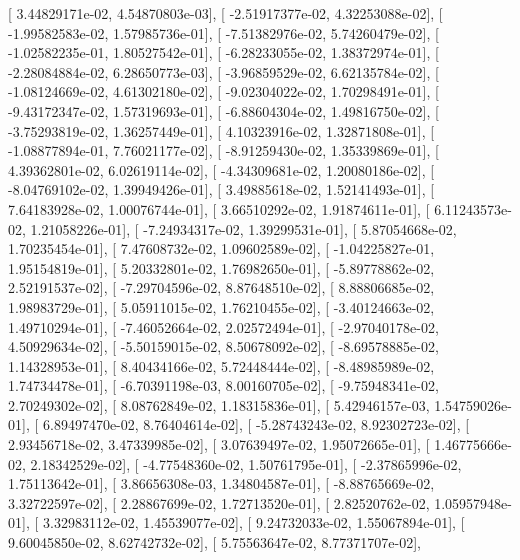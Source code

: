 \documentclass{article}
\begin{document}
       [  3.44829171e-02,   4.54870803e-03],
       [ -2.51917377e-02,   4.32253088e-02],
       [ -1.99582583e-02,   1.57985736e-01],
       [ -7.51382976e-02,   5.74260479e-02],
       [ -1.02582235e-01,   1.80527542e-01],
       [ -6.28233055e-02,   1.38372974e-01],
       [ -2.28084884e-02,   6.28650773e-03],
       [ -3.96859529e-02,   6.62135784e-02],
       [ -1.08124669e-02,   4.61302180e-02],
       [ -9.02304022e-02,   1.70298491e-01],
       [ -9.43172347e-02,   1.57319693e-01],
       [ -6.88604304e-02,   1.49816750e-02],
       [ -3.75293819e-02,   1.36257449e-01],
       [  4.10323916e-02,   1.32871808e-01],
       [ -1.08877894e-01,   7.76021177e-02],
       [ -8.91259430e-02,   1.35339869e-01],
       [  4.39362801e-02,   6.02619114e-02],
       [ -4.34309681e-02,   1.20080186e-02],
       [ -8.04769102e-02,   1.39949426e-01],
       [  3.49885618e-02,   1.52141493e-01],
       [  7.64183928e-02,   1.00076744e-01],
       [  3.66510292e-02,   1.91874611e-01],
       [  6.11243573e-02,   1.21058226e-01],
       [ -7.24934317e-02,   1.39299531e-01],
       [  5.87054668e-02,   1.70235454e-01],
       [  7.47608732e-02,   1.09602589e-02],
       [ -1.04225827e-01,   1.95154819e-01],
       [  5.20332801e-02,   1.76982650e-01],
       [ -5.89778862e-02,   2.52191537e-02],
       [ -7.29704596e-02,   8.87648510e-02],
       [  8.88806685e-02,   1.98983729e-01],
       [  5.05911015e-02,   1.76210455e-02],
       [ -3.40124663e-02,   1.49710294e-01],
       [ -7.46052664e-02,   2.02572494e-01],
       [ -2.97040178e-02,   4.50929634e-02],
       [ -5.50159015e-02,   8.50678092e-02],
       [ -8.69578885e-02,   1.14328953e-01],
       [  8.40434166e-02,   5.72448444e-02],
       [ -8.48985989e-02,   1.74734478e-01],
       [ -6.70391198e-03,   8.00160705e-02],
       [ -9.75948341e-02,   2.70249302e-02],
       [  8.08762849e-02,   1.18315836e-01],
       [  5.42946157e-03,   1.54759026e-01],
       [  6.89497470e-02,   8.76404614e-02],
       [ -5.28743243e-02,   8.92302723e-02],
       [  2.93456718e-02,   3.47339985e-02],
       [  3.07639497e-02,   1.95072665e-01],
       [  1.46775666e-02,   2.18342529e-02],
       [ -4.77548360e-02,   1.50761795e-01],
       [ -2.37865996e-02,   1.75113642e-01],
       [  3.86656308e-03,   1.34804587e-01],
       [ -8.88765669e-02,   3.32722597e-02],
       [  2.28867699e-02,   1.72713520e-01],
       [  2.82520762e-02,   1.05957948e-01],
       [  3.32983112e-02,   1.45539077e-02],
       [  9.24732033e-02,   1.55067894e-01],
       [  9.60045850e-02,   8.62742732e-02],
       [  5.75563647e-02,   8.77371707e-02],
\end{document}
